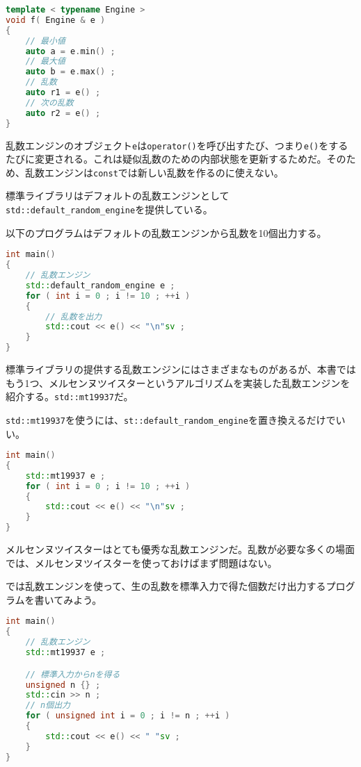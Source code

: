 \begin{lstlisting}[language={C++}]
template < typename Engine >
void f( Engine & e )
{
    // 最小値
    auto a = e.min() ;
    // 最大値
    auto b = e.max() ;
    // 乱数
    auto r1 = e() ;
    // 次の乱数
    auto r2 = e() ;
}
\end{lstlisting}

乱数エンジンのオブジェクト\texttt{e}は\texttt{operator()}を呼び出すたび、つまり\texttt{e()}をするたびに変更される。これは疑似乱数のための内部状態を更新するためだ。そのため、乱数エンジンは\texttt{const}では新しい乱数を作るのに使えない。

標準ライブラリはデフォルトの乱数エンジンとして\texttt{std::default\_random\_engine}を提供している。

以下のプログラムはデフォルトの乱数エンジンから乱数を10個出力する。

\begin{lstlisting}[language={C++}]
int main()
{
    // 乱数エンジン
    std::default_random_engine e ;
    for ( int i = 0 ; i != 10 ; ++i )
    {
        // 乱数を出力
        std::cout << e() << "\n"sv ;
    }
}
\end{lstlisting}

標準ライブラリの提供する乱数エンジンにはさまざまなものがあるが、本書ではもう1つ、メルセンヌツイスターというアルゴリズムを実装した乱数エンジンを紹介する。\texttt{std::mt19937}だ。

\texttt{std::mt19937}を使うには、\texttt{st::default\_random\_engine}を置き換えるだけでいい。

\begin{lstlisting}[language={C++}]
int main()
{
    std::mt19937 e ;
    for ( int i = 0 ; i != 10 ; ++i )
    {
        std::cout << e() << "\n"sv ;
    }
}
\end{lstlisting}

メルセンヌツイスターはとても優秀な乱数エンジンだ。乱数が必要な多くの場面では、メルセンヌツイスターを使っておけばまず問題はない。

では乱数エンジンを使って、生の乱数を標準入力で得た個数だけ出力するプログラムを書いてみよう。

\begin{lstlisting}[language={C++}]
int main()
{
    // 乱数エンジン
    std::mt19937 e ;

    // 標準入力からnを得る
    unsigned n {} ;
    std::cin >> n ;
    // n個出力
    for ( unsigned int i = 0 ; i != n ; ++i )
    {
        std::cout << e() << " "sv ;
    }
}
\end{lstlisting}

